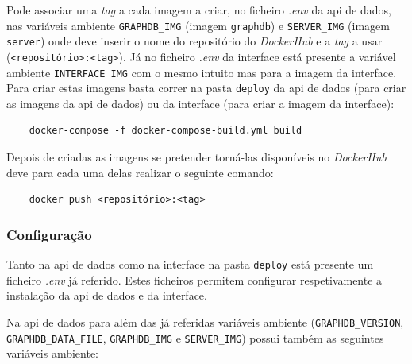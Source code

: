 Pode associar uma \textit{tag} a cada imagem a criar, no ficheiro \textit{.env} da \acrshort{api} de dados, nas variáveis ambiente \texttt{GRAPHDB\_IMG} (imagem \texttt{graphdb}) e \texttt{SERVER\_IMG} (imagem \texttt{server}) onde deve inserir o nome do repositório do \textit{DockerHub} e a \textit{tag} a usar (\verb|<repositório>:<tag>|). Já no ficheiro \textit{.env} da interface está presente a variável ambiente \texttt{INTERFACE\_IMG} com o mesmo intuito mas para a imagem da interface. Para criar estas imagens basta correr na pasta \texttt{deploy} da \acrshort{api} de dados (para criar as imagens da \acrshort{api} de dados) ou da interface (para criar a imagem da interface):

\footnotesize
\begin{verbatim}
    docker-compose -f docker-compose-build.yml build
\end{verbatim}
\normalsize

Depois de criadas as imagens se pretender torná-las disponíveis no \textit{DockerHub} deve para cada uma delas realizar o seguinte comando:
\footnotesize
\begin{verbatim}
    docker push <repositório>:<tag>
\end{verbatim}
\normalsize

\subsubsection{Configuração}\label{sec:int-config}
Tanto na \acrshort{api} de dados como na interface na pasta \texttt{deploy} está presente um ficheiro \textit{.env} já referido. Estes ficheiros permitem configurar respetivamente a instalação da \acrshort{api} de dados e da interface.

Na \acrshort{api} de dados para além das já referidas variáveis ambiente (\texttt{GRAPHDB\_VERSION}, \texttt{GRAPHDB\_DATA\_FILE}, \texttt{GRAPHDB\_IMG} e \texttt{SERVER\_IMG}) possui também as seguintes variáveis ambiente:

